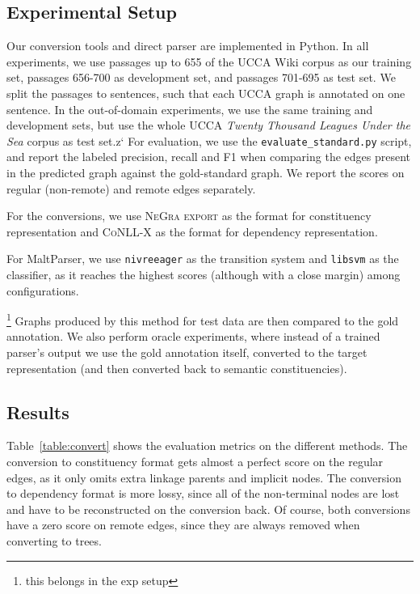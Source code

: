 \documentclass[11pt]{article}
\newcommand{\oa}[1]{\footnote{\color{red} #1}}
\newcommand{\tabref}[1]{Table~\ref{#1}}
\begin{document}
\subsection{Experimental Setup}

Our conversion tools and direct parser are implemented in Python. In all experiments, we use passages up to 655 of the UCCA Wiki corpus as our training set, passages 656-700 as development set, and passages 701-695 as test set. We split the passages to sentences, such that each UCCA graph is annotated on one sentence. In the out-of-domain experiments, we use the same training and development sets, but use the whole UCCA \textit{Twenty Thousand Leagues Under the Sea} corpus as test set.z`
For evaluation, we use the \texttt{evaluate\_standard.py} script, and report the labeled precision, recall and F1 when comparing the edges present in the predicted graph against the gold-standard graph. We report the scores on regular (non-remote) and remote edges separately.

For the conversions, we use \textsc{NeGra export} as the format for constituency representation and \textsc{CoNLL-X} as the format for dependency representation.

For MaltParser, we use \texttt{nivreeager} as the transition system and \texttt{libsvm} as the classifier, as it reaches the highest scores (although with a close margin) among configurations.

\oa{this belongs in the exp setup}
Graphs produced by this method for test data are then compared to the gold annotation.
We also perform oracle experiments, where instead of a trained parser's output we use the
gold annotation itself, converted to the target representation
(and then converted back to semantic constituencies).


\subsection{Results}

\tabref{table:convert} shows the evaluation metrics on the different methods.
The conversion to constituency format gets almost a perfect score on the regular edges, as it only omits extra linkage parents and implicit nodes. The conversion to dependency format is more lossy, since all of the non-terminal nodes are lost and have to be reconstructed on the conversion back. Of course, both conversions have a zero score on remote edges, since they are always removed when converting to trees.
\end{document}
